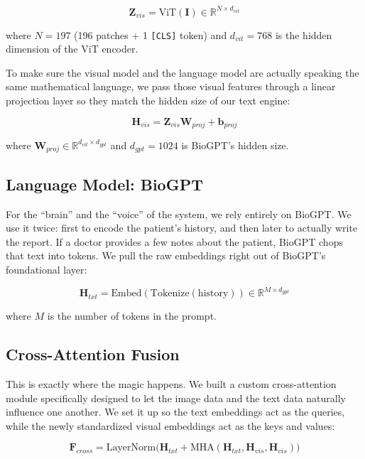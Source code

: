 \documentclass[conference]{IEEEtran}
\begin{document}
\begin{equation}
    \mathbf{Z}_{vis} = \text{ViT}(\mathbf{I}) \in \mathbb{R}^{N \times d_{vit}}
\end{equation}

\noindent where $N = 197$ (196 patches + 1 \texttt{[CLS]} token) and $d_{vit} = 768$ is the hidden dimension of the ViT encoder.

To make sure the visual model and the language model are actually speaking the same mathematical language, we pass those visual features through a linear projection layer so they match the hidden size of our text engine:

\begin{equation}
    \mathbf{H}_{vis} = \mathbf{Z}_{vis} \mathbf{W}_{proj} + \mathbf{b}_{proj}
\end{equation}

\noindent where $\mathbf{W}_{proj} \in \mathbb{R}^{d_{vit} \times d_{gpt}}$ and $d_{gpt} = 1024$ is BioGPT's hidden size.

\subsection{Language Model: BioGPT}
For the ``brain'' and the ``voice'' of the system, we rely entirely on BioGPT. We use it twice: first to encode the patient's history, and then later to actually write the report. If a doctor provides a few notes about the patient, BioGPT chops that text into tokens. We pull the raw embeddings right out of BioGPT's foundational layer:

\begin{equation}
    \mathbf{H}_{txt} = \text{Embed}(\text{Tokenize}(\text{history})) \in \mathbb{R}^{M \times d_{gpt}}
\end{equation}

\noindent where $M$ is the number of tokens in the prompt.

\subsection{Cross-Attention Fusion}
This is exactly where the magic happens. We built a custom cross-attention module specifically designed to let the image data and the text data naturally influence one another. We set it up so the text embeddings act as the queries, while the newly standardized visual embeddings act as the keys and values:

\begin{equation}
    \mathbf{F}_{cross} = \text{LayerNorm}\Big(\mathbf{H}_{txt} + \text{MHA}(\mathbf{H}_{txt}, \mathbf{H}_{vis}, \mathbf{H}_{vis})\Big)
\end{equation}
\end{document}

